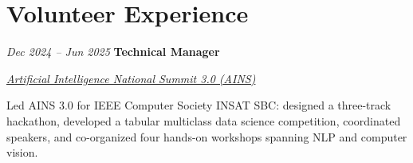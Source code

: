 \section{Volunteer Experience}

\begin{twocolentry}{
    \textit{Dec 2024 – Jun 2025}}
    \textbf{Technical Manager}

    \textit{\href{https://www.ai-national-summit.tech}{Artificial Intelligence National Summit 3.0 (AINS)}}
\end{twocolentry}
\vspace{0.10 cm}
\begin{onecolentry}
    \begin{highlights}
        \item Led AINS 3.0 for IEEE Computer Society INSAT SBC: designed a three-track hackathon, developed a tabular multiclass data science competition, coordinated speakers, and co-organized four hands-on workshops spanning NLP and computer vision.
    \end{highlights}
\end{onecolentry}
